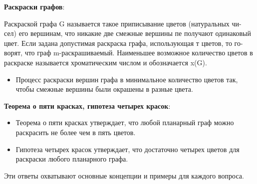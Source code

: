 \documentclass[
]{article}
\providecommand{\tightlist}{%
  \setlength{\itemsep}{0pt}\setlength{\parskip}{0pt}}
\begin{document}
\begin{enumerate}
{{{{{\begin{itemize}
  \end{itemize}
\item
  \textbf{Раскраски графов}:

Раскраской графа G называется такое приписывание цветов (натуральных чи-
сел) его вершинам, что никакие две смежные вершины пе получают одинаковый
цвет. Если задана допустимая раскраска графа, использующая т цветов, то го-
ворят, что граф m-раскрашиваемый. Наименьшее возможное количество цветов
в раскраске называется хроматическим числом и обозначается x(G).
  \begin{itemize}
  \tightlist
  \item
    Процесс раскраски вершин графа в минимальное количество цветов так,
    чтобы смежные вершины были окрашены в разные цвета.
  \end{itemize}
\item
  \textbf{Теорема о пяти красках, гипотеза четырех красок}:
  \begin{itemize}
  \tightlist
  \item
    Теорема о пяти красках утверждает, что любой планарный граф можно
    раскрасить не более чем в пять цветов.
  \item
    Гипотеза четырех красок утверждает, что достаточно четырех цветов
    для раскраски любого планарного графа.
  \end{itemize}
}}}}}\end{enumerate}


Эти ответы охватывают основные концепции и примеры для каждого вопроса.
\end{document}
